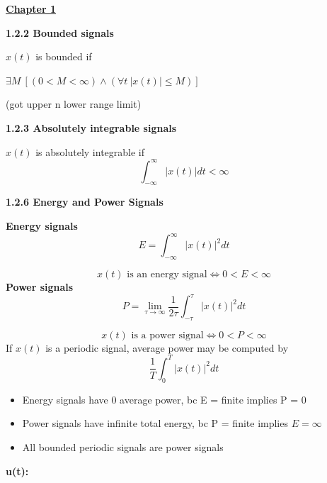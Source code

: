 \documentclass[landscape,a4paper]{extarticle}
\begin{document}
\fontsize{6}{8}\selectfont
{}\selectfont
\begin{multicols*}{5}

    \textbf{\uline{Chapter 1}}

    \textbf{1.2.2 Bounded signals}

    $x(t)$ is bounded if 

    $\exists M\ [(0 < M < \infty) \wedge (\forall t\ |x(t)| \leq M)]$

    (got upper n lower range limit)

    \textbf{1.2.3 Absolutely integrable signals}

    $x(t)$ is absolutely integrable if 
    \[
        \int_{-\infty}^{\infty}|x(t)| dt < \infty
    \]




    \textbf{1.2.6 Energy and Power Signals}

    \textbf{Energy signals}
    \[
        E = \int_{-\infty}^{\infty}|x(t)|^2 dt \tag{1.3a}
    \]
    
    \[
        x(t) \text{ is an energy signal} \iff 0 < E < \infty \tag{1.3b}
    \]
    \textbf{Power signals}
    \[
        P = \lim_{\tau \to \infty}\frac{1}{2\tau}\int_{-\tau}^{\tau}|x(t)|^2dt \tag{1.4a}
    \]

    \[
        x(t) \text{ is a power signal} \iff 0 < P < \infty \tag{1.4b}
    \]
    If $x(t)$ is a periodic signal, average power may be computed by
    \[
        \frac{1}{T}\int_0^T|x(t)|^2 dt
    \]
    \begin{itemize}
        \item Energy signals have 0 average power, bc E = finite implies P = 0
        \item Power signals have infinite total energy, bc P = finite implies $E = \infty$
        \item All bounded periodic signals are power signals
    \end{itemize}
    \textbf{u(t):}


\end{multicols*}
\end{document}
